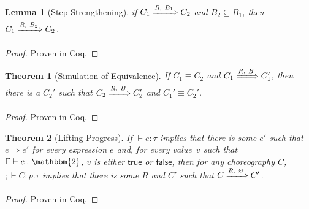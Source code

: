 \documentclass{article}
\newtheorem{thm}{Theorem}
\newtheorem{lem}{Lemma}
\theoremstyle{definition}
\newcommand{\bool}{\mathbbm{2}}
\newcommand{\ett}{\textsf{true}}
\newcommand{\eff}{\textsf{false}}
\newcommand{\To}{\Rightarrow}
\newcommand{\subst}[3]{#1~[#2 \mapsto #3]}
\newcommand{\ceq}{\equiv}
\newcommand{\own}[2]{#1.#2}
\newcommand{\send}[3][]{#2\nolinebreak \mathrel{\xrightarrow{#1}}\nolinebreak #3}
\newcommand{\cif}[3]{\textsf{if}~#1 \mathrel{\textsf{then}}\nolinebreak #2 \mathrel{\textsf{else}}\nolinebreak #3}
\newcommand{\clet}[2]{\textsf{let}~#1\nolinebreak =\nolinebreak #2 \mathrel{\textsf{in}}}
\newcommand{\proves}{\vdash}
\begin{document}
\noindent{}

\begin{lem}[Step Strengthening]
  if $C_1 \xRightarrow{R,~B_1} C_2$ and $B_2 \subseteq B_1$, then $C_1 \xRightarrow{R,~B_2} C_2$.
\end{lem}
\begin{proof}
  Proven in Coq.
\end{proof}

\begin{thm}[Simulation of Equivalence]
  \label{thm:simulation-equiv}
  If $C_1 \ceq C_2$ and $C_1 \xRightarrow{R,~B} C_1'$, then there is a $C_2'$ such that $C_2 \xRightarrow{R,~B} C_2'$ and $C_1' \ceq C_2'$.
\end{thm}
\begin{proof}
  Proven in Coq.
\end{proof}

\begin{thm}[Lifting Progress]
  \label{thm:lifting-progress}
  If $\proves e : \tau$ implies that there is some $e'$ such that $e \To e'$ for every expression $e$ and, for every value~$v$ such that $\Gamma \proves c : \bool$, $v$ is either $\ett$ or $\eff$, then for any choreography $C$, $; \proves C : p.\tau$ implies that there is some $R$ and $C'$ such that $C \xRightarrow{R,~\varnothing} C'$.
\end{thm}
\begin{proof}
  Proven in Coq.
\end{proof}
\end{document}
